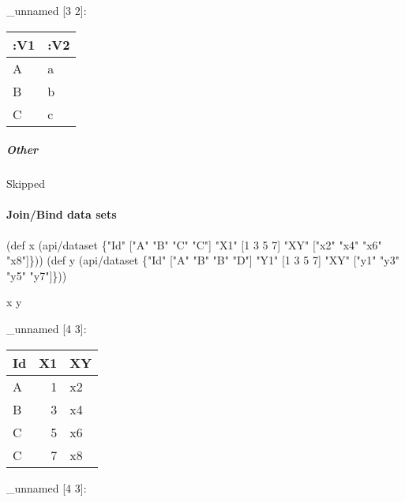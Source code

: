 \documentclass[]{article}
\newenvironment{Shaded}{\begin{snugshade}}{\end{snugshade}}
\newcommand{\DecValTok}[1]{\textcolor[rgb]{0.00,0.00,0.81}{#1}}
\newcommand{\StringTok}[1]{\textcolor[rgb]{0.31,0.60,0.02}{#1}}
\newcommand{\FunctionTok}[1]{\textcolor[rgb]{0.00,0.00,0.00}{#1}}
\newcommand{\BuiltInTok}[1]{#1}
\newcommand{\NormalTok}[1]{#1}
\let\oldparagraph\paragraph
\renewcommand{\paragraph}[1]{\oldparagraph{#1}\mbox{}}
\let\oldsubparagraph\subparagraph
\renewcommand{\subparagraph}[1]{\oldsubparagraph{#1}\mbox{}}
\begin{document}
\_unnamed {[}3 2{]}:

\begin{longtable}[]{@{}ll@{}}
\toprule
:V1 & :V2\tabularnewline
\midrule
\endhead
A & a\tabularnewline
B & b\tabularnewline
C & c\tabularnewline
\bottomrule
\end{longtable}

\subparagraph{Other}\label{other-1}

Skipped

\paragraph{Join/Bind data sets}\label{joinbind-data-sets}

\begin{Shaded}
\begin{Highlighting}[]
\NormalTok{(}\BuiltInTok{def}\FunctionTok{ x }\NormalTok{(api/dataset \{}\StringTok{"Id"}\NormalTok{ [}\StringTok{"A"} \StringTok{"B"} \StringTok{"C"} \StringTok{"C"}\NormalTok{]}
                     \StringTok{"X1"}\NormalTok{ [}\DecValTok{1} \DecValTok{3} \DecValTok{5} \DecValTok{7}\NormalTok{]}
                     \StringTok{"XY"}\NormalTok{ [}\StringTok{"x2"} \StringTok{"x4"} \StringTok{"x6"} \StringTok{"x8"}\NormalTok{]\}))}
\NormalTok{(}\BuiltInTok{def}\FunctionTok{ y }\NormalTok{(api/dataset \{}\StringTok{"Id"}\NormalTok{ [}\StringTok{"A"} \StringTok{"B"} \StringTok{"B"} \StringTok{"D"}\NormalTok{]}
                     \StringTok{"Y1"}\NormalTok{ [}\DecValTok{1} \DecValTok{3} \DecValTok{5} \DecValTok{7}\NormalTok{]}
                     \StringTok{"XY"}\NormalTok{ [}\StringTok{"y1"} \StringTok{"y3"} \StringTok{"y5"} \StringTok{"y7"}\NormalTok{]\}))}
\end{Highlighting}
\end{Shaded}

\begin{Shaded}
\begin{Highlighting}[]
\NormalTok{x y}
\end{Highlighting}
\end{Shaded}

\_unnamed {[}4 3{]}:

\begin{longtable}[]{@{}lrl@{}}
\toprule
Id & X1 & XY\tabularnewline
\midrule
\endhead
A & 1 & x2\tabularnewline
B & 3 & x4\tabularnewline
C & 5 & x6\tabularnewline
C & 7 & x8\tabularnewline
\bottomrule
\end{longtable}

\_unnamed {[}4 3{]}:
\end{document}

